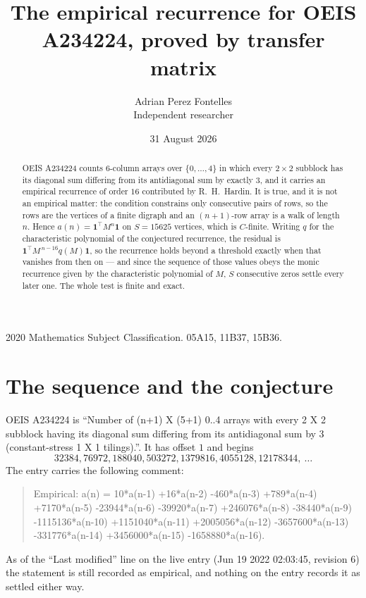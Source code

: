 \documentclass[11pt,a4paper]{article}
\title{The empirical recurrence for OEIS A234224, proved by transfer matrix}
\author{Adrian Perez Fontelles\\ \small Independent researcher}
\date{31 August 2026}
\theoremstyle{plain}
\theoremstyle{definition}
\begin{document}
\maketitle

\begin{abstract}
OEIS A234224 counts $6$-column arrays over $\{0,\dots,4\}$ in which every
$2\times2$ subblock has its diagonal sum differing from its antidiagonal sum by
exactly $3$, and it
carries an empirical recurrence of order $16$ contributed by R.~H.~Hardin. It is true,
and it is not an empirical matter: the condition constrains only consecutive pairs of rows,
so the rows are the vertices of a finite digraph and an $(n+1)$-row array is a walk of
length $n$. Hence $a(n)=\mathbf{1}^{\!\top}M^{n}\mathbf{1}$ on $S=15625$ vertices, which
is $C$-finite. Writing $q$ for the characteristic polynomial of the conjectured recurrence,
the residual is $\mathbf{1}^{\!\top}M^{\,n-16}q(M)\mathbf{1}$, so the recurrence
holds beyond a threshold exactly when that vanishes from then on --- and since the sequence
of those values obeys the monic recurrence given by the characteristic polynomial of $M$,
$S$ consecutive zeros settle every later one. The whole test is finite and exact.
\end{abstract}

\noindent\small 2020 Mathematics Subject Classification. 05A15, 11B37, 15B36.\normalsize

\section{The sequence and the conjecture}

OEIS A234224 is ``Number of (n+1) X (5+1) 0..4 arrays with every 2 X 2 subblock having its diagonal sum differing from its antidiagonal sum by 3 (constant-stress 1 X 1 tilings).''. It has offset
$1$ and begins
\[
32384, 76972, 188040, 503272, 1379816, 4055128, 12178344,\ \dots
\]
The entry carries the following comment:
\begin{quote}\small
Empirical: a(n) = 10*a(n-1) +16*a(n-2) -460*a(n-3) +789*a(n-4) +7170*a(n-5) -23944*a(n-6) -39920*a(n-7) +246076*a(n-8) -38440*a(n-9) -1115136*a(n-10) +1151040*a(n-11) +2005056*a(n-12) -3657600*a(n-13) -331776*a(n-14) +3456000*a(n-15) -1658880*a(n-16).
\end{quote}
As of the ``Last modified'' line on the live entry (Jun 19 2022 02:03:45, revision 6) the statement is
still recorded as empirical, and nothing on the entry records it as settled either way.
\end{document}

